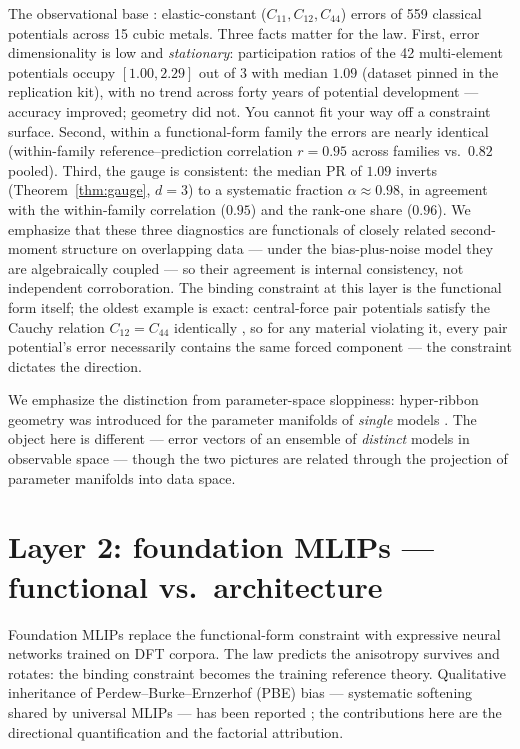 \documentclass[11pt]{article}
\theoremstyle{remark}
\begin{document}
The observational base \citep{welcing2026instance}: elastic-constant
($C_{11}, C_{12}, C_{44}$) errors of 559 classical potentials across 15 cubic
metals. Three facts matter for the law. First, error dimensionality is low and
\emph{stationary}: participation ratios of the 42 multi-element potentials
occupy $[1.00, 2.29]$ out of 3 with median $1.09$ (dataset pinned in the
replication kit), with no trend across forty years of potential development
--- accuracy improved; geometry did not. You cannot fit your way off a
constraint surface. Second, within a functional-form family the errors are
nearly identical (within-family reference--prediction correlation $r = 0.95$
across families vs.\ $0.82$ pooled). Third, the gauge is consistent: the
median PR of $1.09$ inverts (Theorem~\ref{thm:gauge}, $d{=}3$) to a systematic
fraction $\alpha \approx 0.98$, in agreement with the within-family
correlation ($0.95$) and the rank-one share ($0.96$). We emphasize that these
three diagnostics are functionals of closely related second-moment structure
on overlapping data --- under the bias-plus-noise model they are algebraically
coupled --- so their agreement is internal consistency, not independent
corroboration. The binding constraint at this layer is the functional form
itself; the oldest example is exact: central-force pair potentials satisfy
the Cauchy relation $C_{12}=C_{44}$ identically \citep{born1954}, so for any
material violating it, every pair potential's error necessarily contains the
same forced component --- the constraint dictates the direction.

We emphasize the distinction from parameter-space sloppiness: hyper-ribbon
geometry was introduced for the parameter manifolds of \emph{single} models
\citep{transtrum2011,machta2013,quinn2023,kurniawan2022}. The object here is
different --- error vectors of an ensemble of \emph{distinct} models in
observable space --- though the two pictures are related through the
projection of parameter manifolds into data space.

\section{Layer 2: foundation MLIPs --- functional vs.\ architecture}
\label{sec:mlip}

Foundation MLIPs replace the functional-form constraint with expressive neural
networks trained on DFT corpora. The law predicts the anisotropy survives and
rotates: the binding constraint becomes the training reference theory.
Qualitative inheritance of Perdew--Burke--Ernzerhof (PBE) bias --- systematic
softening shared by universal MLIPs --- has been reported
\citep{deng2025softening,yu2024}; the contributions here are the directional
quantification and the factorial attribution.
\end{document}
